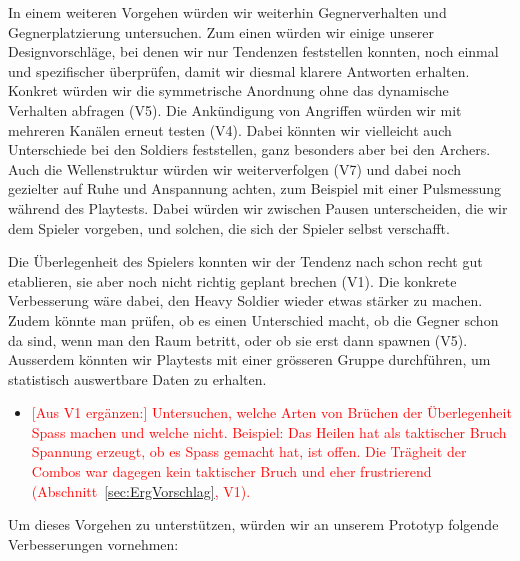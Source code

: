 \documentclass[../Main.tex]{subfiles}
\begin{document}
In einem weiteren Vorgehen würden wir weiterhin Gegnerverhalten und Gegnerplatzierung untersuchen. Zum einen würden wir einige unserer Designvorschläge, bei denen wir nur Tendenzen feststellen konnten, noch einmal und spezifischer überprüfen, damit wir diesmal klarere Antworten erhalten. Konkret würden wir die symmetrische Anordnung ohne das dynamische Verhalten abfragen (V5). Die Ankündigung von Angriffen würden wir mit mehreren Kanälen erneut testen (V4). Dabei könnten wir vielleicht auch Unterschiede bei den Soldiers feststellen, ganz besonders aber bei den Archers. Auch die Wellenstruktur würden wir weiterverfolgen (V7) und dabei noch gezielter auf Ruhe und Anspannung achten, zum Beispiel mit einer Pulsmessung während des Playtests.\autocite[285--287]{drachen2018gamesuserresearch} Dabei würden wir zwischen Pausen unterscheiden, die wir dem Spieler vorgeben, und solchen, die sich der Spieler selbst verschafft.

Die Überlegenheit des Spielers konnten wir der Tendenz nach schon recht gut etablieren, sie aber noch nicht richtig geplant brechen (V1). Die konkrete Verbesserung wäre dabei, den Heavy Soldier wieder etwas stärker zu machen. Zudem könnte man prüfen, ob es einen Unterschied macht, ob die Gegner schon da sind, wenn man den Raum betritt, oder ob sie erst dann spawnen (V5). Ausserdem könnten wir Playtests mit einer grösseren Gruppe durchführen, um statistisch auswertbare Daten zu erhalten.

\begin{itemize}[leftmargin=1.5cm]
    \item \textcolor{red}{[Aus V1 ergänzen:] Untersuchen, welche Arten von Brüchen der Überlegenheit Spass machen und welche nicht. Beispiel: Das Heilen hat als taktischer Bruch Spannung erzeugt, ob es Spass gemacht hat, ist offen. Die Trägheit der Combos war dagegen kein taktischer Bruch und eher frustrierend (Abschnitt~\ref{sec:ErgVorschlag}, V1).}
\end{itemize}

Um dieses Vorgehen zu unterstützen, würden wir an unserem Prototyp folgende Verbesserungen vornehmen:
\end{document}
